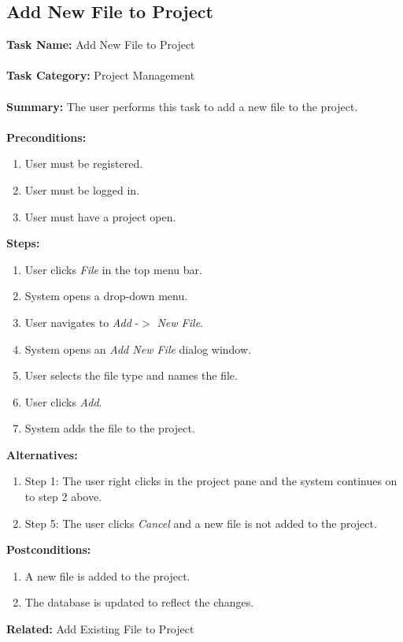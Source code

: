\documentclass[14pt, a4paper]{article}
\begin{document}
\newpage

\subsection{Add New File to Project}

\begin{framed}
	\noindent\textbf{Task Name:} Add New File to Project \\ \\
	\textbf{Task Category:} Project Management \\ \\
	\textbf{Summary:} The user performs this task to add a new file to the project. \\ \\
	\textbf{Preconditions:} 
	\begin{enumerate}
		\item User must be registered.
		\item User must be logged in.
		\item User must have a project open.
	\end{enumerate}
	\textbf{Steps:}
	\begin{enumerate}
		\item User clicks \textit{File} in the top menu bar.
		\item System opens a drop-down menu.
		\item User navigates to \textit{Add} -$>$ \textit{New File}.
		\item System opens an \textit{Add New File} dialog window.
		\item User selects the file type and names the file.
		\item User clicks \textit{Add}.
		\item System adds the file to the project.
	\end{enumerate}
	\textbf{Alternatives:} 
	\begin{enumerate}
		\item Step 1: The user right clicks in the project pane and the system continues on to step 2 above.
		\item Step 5: The user clicks \textit{Cancel} and a new file is not added to the project.
	\end{enumerate}
	\textbf{Postconditions:}
	\begin{enumerate}
		\item A new file is added to the project.
		\item The database is updated to reflect the changes.
	\end{enumerate}
	\textbf{Related:} Add Existing File to Project
\end{framed} 
\end{document}
